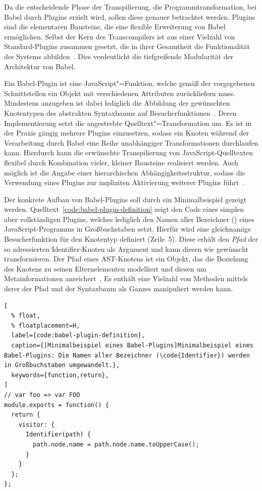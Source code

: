 Da die entscheidende Phase der Transpilierung, die Programmtransformation, bei Babel durch Plugins erzielt wird, sollen diese genauer betrachtet werden. Plugins sind die elementaren Bausteine, die eine flexible Erweiterung von Babel ermöglichen. Selbst der Kern des Transcompilers ist aus einer Vielzahl von Standard-Plugins zusammen gesetzt, die in ihrer Gesamtheit die Funktionalität des Systems abbilden~\autocite{BABEL}. Dies verdeutlicht die tiefgreifende Modularität der Architektur von Babel.

Ein Babel-Plugin ist eine JavaScript"=Funktion, welche gemäß der vorgegebenen Schnittstellen ein Objekt mit verschiedenen Attributen zurückliefern muss. Mindestens anzugeben ist dabei lediglich die Abbildung der gewünschten Knotentypen des abstrakten Syntaxbaums auf Besucherfunktionen~\autocite{BABEL:HANDBOOK}. Deren Implementierung setzt die angestrebte Quelltext"=Transformation um. Es ist in der Praxis gängig mehrere Plugins einzusetzen, sodass ein Knoten während der Verarbeitung durch Babel eine Reihe unabhängiger Transformationen durchlaufen kann. Hierdurch kann die erwünschte Transpilierung von JavaScript-Quelltexten flexibel durch Kombination vieler, kleiner Bausteine realisiert werden. Auch möglich ist die Angabe einer hierarchischen Abhängigkeitsstruktur, sodass die Verwendung eines Plugins zur impliziten Aktivierung weiterer Plugins führt~\autocite{BABEL:HANDBOOK}.

Der konkrete Aufbau von Babel-Plugins soll durch ein Minimalbeispiel gezeigt werden. Quelltext~\ref{code:babel-plugin-definition} zeigt den Code eines simplen aber vollständigen Plugins, welches lediglich den Namen aller Bezeichner () eines JavaScript-Programms in Großbuchstaben setzt. Hierfür wird eine gleichnamige Besucherfunktion für den Knotentyp  definiert (Zeile~5). Diese erhält den \emph{Pfad} der so adressierten Identifier-Knoten als Argument und kann diesen wie gewünscht transformieren. Der Pfad eines AST-Knotens ist ein Objekt, das die Beziehung des Knotens zu seinen Elternelementen modelliert und diesen um Metainformationen anreichert~\autocite{BABEL:HANDBOOK}. Es enthält eine Vielzahl von Methoden mittels derer der Pfad und der Syntaxbaum als Ganzes manipuliert werden kann.

\begin{lstlisting}[
  % float,
  % floatplacement=H,
  label={code:babel-plugin-definition},
  caption={[Minimalbeispiel eines Babel-Plugins]Minimalbeispiel eines Babel-Plugins: Die Namen aller Bezeichner (\code{Identifier}) werden in Großbuchstaben umgewandelt.},
  keywords={function,return},
]
// var foo => var FOO
module.exports = function() {
  return {
    visitor: {
      Identifier(path) {
        path.node.name = path.node.name.toUpperCase();
      }
    }
  };
};
\end{lstlisting}

